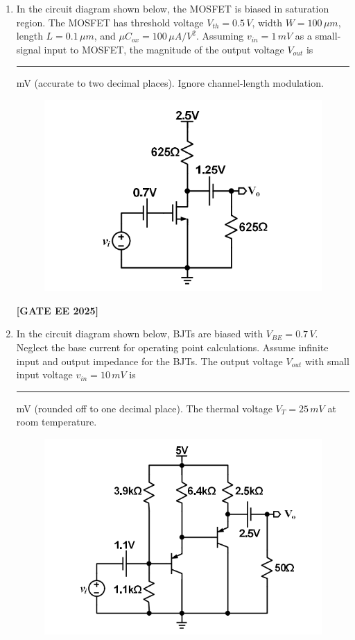 \documentclass[journal]{IEEEtran}
\newcommand{\qfooter}{%
  \begin{flushright}\footnotesize\textbf{[GATE EE 2025]}\end{flushright}\vspace{1em}%
}
\begin{document}
\begin{enumerate}
\qfooter

\item In the circuit diagram shown below, the MOSFET is biased in saturation region.
The MOSFET has threshold voltage \(V_{th} = 0.5\,V\), width \(W=100\,\mu m\), length \(L=0.1\,\mu m\), and \(\mu C_{ox} = 100\,\mu A/V^2\).
Assuming \(v_{in} = 1\,mV\) as a small-signal input to MOSFET, the magnitude of the output voltage \(V_{out}\) is \rule{2cm}{0.15mm} mV (accurate to two decimal places).
Ignore channel-length modulation.

\begin{figure}[H]
    \centering
    \includegraphics[width=0.6\columnwidth]{figs/q55.png}
\end{figure}

\qfooter

\item In the circuit diagram shown below, BJTs are biased with \(V_{BE} = 0.7\,V\).
Neglect the base current for operating point calculations.
Assume infinite input and output impedance for the BJTs.
The output voltage \(V_{out}\) with small input voltage \(v_{in} = 10\,mV\) is \rule{2cm}{0.15mm} mV (rounded off to one decimal place).
The thermal voltage \(V_T = 25\,mV\) at room temperature.

\begin{figure}[H]
    \centering
    \includegraphics[width=0.6\columnwidth]{figs/q56.png}
\end{figure}


\end{enumerate}
\end{document}
